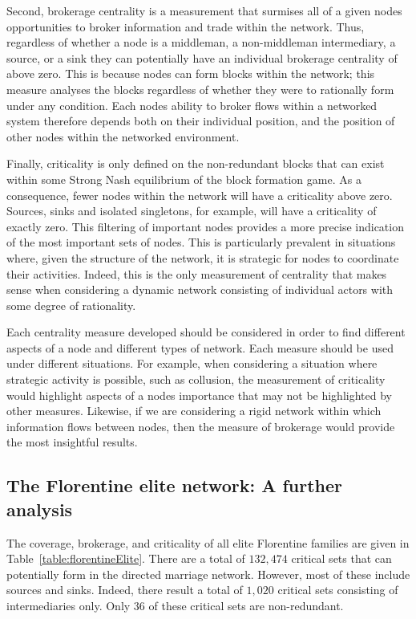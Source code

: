 Second, brokerage centrality is a measurement that surmises all of a given nodes opportunities to broker information and trade within the network. Thus, regardless of whether a node is a middleman, a non-middleman intermediary, a source, or a sink they can potentially have an individual brokerage centrality of above zero. This is because nodes can form blocks within the network; this measure analyses the blocks regardless of whether they were to rationally form under any condition. Each nodes ability to broker flows within a networked system therefore depends both on their individual position, and the position of other nodes within the networked environment.

Finally, criticality is only defined on the non-redundant blocks that can exist within some Strong Nash equilibrium of the block formation game. As a consequence, fewer nodes within the network will have a criticality above zero. Sources, sinks and isolated singletons, for example, will have a criticality of exactly zero. This filtering of important nodes provides a more precise indication of the most important sets of nodes. This is particularly prevalent in situations where, given the structure of the network, it is strategic for nodes to coordinate their activities. Indeed, this is the only measurement of centrality that makes sense when considering a dynamic network consisting of individual actors with some degree of rationality.

Each centrality measure developed should be considered in order to find different aspects of a node and different types of network. Each measure should be used under different situations. For example, when considering a situation where strategic activity is possible, such as collusion, the measurement of criticality would highlight aspects of a nodes importance that may not be highlighted by other measures. Likewise, if we are considering a rigid network within which information flows between nodes, then the measure of brokerage would provide the most insightful results.

\subsection{The Florentine elite network: A further analysis}

The coverage, brokerage, and criticality of all elite Florentine families are given in Table~\ref{table:florentineElite}. There are a total of $132,474$ critical sets that can potentially form in the directed marriage network. However, most of these include sources and sinks. Indeed, there result a total of $1,020$ critical sets consisting of intermediaries only. Only $36$ of these critical sets are non-redundant.

